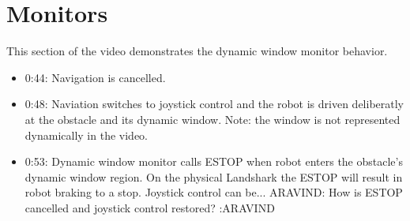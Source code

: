 \documentclass{article}
\begin{document}
\section{Monitors}\label{Section_Monitors}
This section of the video demonstrates the dynamic window monitor 
behavior.
\begin{itemize}
\item 0:44:
Navigation is cancelled. 
\item 0:48:
Naviation switches to joystick control and the robot is driven deliberatly 
at the obstacle and its dynamic window. Note: the window is not represented 
dynamically in the video. 
\item 0:53:
Dynamic window monitor calls ESTOP when robot enters the obstacle's dynamic window 
region. On the physical Landshark the ESTOP will result in robot braking to a stop.  
Joystick control can be... ARAVIND: How is ESTOP cancelled and joystick control 
restored? :ARAVIND
\end{itemize}
\end{document}

